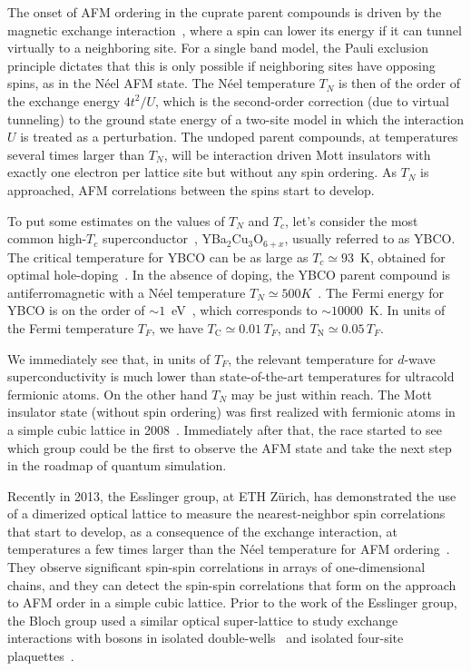 The onset of AFM ordering in the cuprate parent compounds is driven by the
magnetic exchange interaction~\cite{Koch2012}, where a spin can lower its
energy if it can tunnel virtually to a neighboring site.  For a single band
model, the Pauli exclusion principle dictates that this is only possible if
neighboring sites have opposing spins, as in the N\'{e}el AFM state.  The
N\'{e}el temperature $T_{N}$ is then of the order of the exchange energy
$4t^{2}/U$, which is the second-order correction (due to virtual tunneling)  to
the ground state energy of a two-site model in which the interaction $U$ is
treated as a perturbation.   The undoped parent compounds, at temperatures
several times larger than $T_{N}$, will be interaction driven Mott insulators
with exactly one electron per lattice site but without any spin ordering.  As
$T_{N}$ is approached, AFM correlations between the spins start to develop.  

To put some estimates on the values of $T_{N}$ and $T_{c}$, let's consider the
most common high-$T_{c}$ superconductor~\cite{Milton2010},
YBa$_{2}$Cu$_{3}$O$_{6+x}$, usually referred to as YBCO.  The critical
temperature for YBCO can be as large as $T_{c}\simeq 93$~K, obtained for
optimal hole-doping~\cite{Wu1987}. In the absence of doping, the YBCO parent
compound is antiferromagnetic with a N\'{e}el temperature $T_{N} \simeq 500
K$~\cite{Tranquada1988}.  The Fermi energy for YBCO is on the order of $\sim
1$~eV~\cite{liang2008ybco}, which corresponds to $\sim 10000$~K.  In units
of the Fermi temperature $T_{F}$, we have $T_{\text{C}}\simeq0.01\,T_{F}$,
and  $T_{\text{N}}\simeq0.05\,T_{F}$.

We immediately see that, in units of $T_{F}$,  the relevant temperature for
$d$-wave superconductivity is much lower than state-of-the-art temperatures for
ultracold fermionic atoms.  On the other hand $T_{N}$ may be just within reach.
The Mott insulator state (without spin ordering) was first realized with
fermionic atoms in a simple cubic lattice in
2008~\cite{Jordens2008,Schneider2008}.  Immediately after that, the race
started to see which group could be the first to observe the AFM state and take
the next step in the roadmap of quantum simulation.   

Recently in 2013, the Esslinger group, at ETH Z\"{u}rich, has demonstrated the
use of a dimerized optical lattice to measure the nearest-neighbor spin
correlations that start to develop, as a consequence of the exchange
interaction, at temperatures a few times larger than the N\'{e}el temperature
for AFM ordering~\cite{Greif2013}.  They observe significant spin-spin
correlations in arrays of one-dimensional chains, and they can detect the spin-spin
correlations that form on the approach to AFM order in a simple cubic lattice.
Prior to the work of the Esslinger group, the Bloch group used  a similar
optical super-lattice to study exchange interactions with bosons in isolated
double-wells~\cite{Trotzky2008} and isolated four-site
plaquettes~\cite{Nascimbene2012}. 

